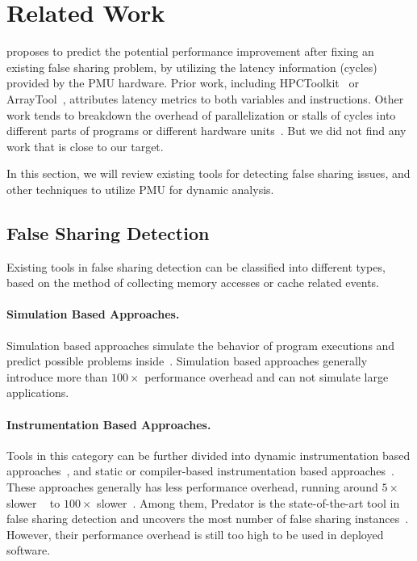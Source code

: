 \section{Related Work}

\label{sec:relatedwork}
\cheetah{} proposes to predict the potential performance improvement after fixing an existing false sharing problem, by utilizing the latency information (cycles) provided by the PMU hardware. Prior work, including HPCToolkit~\cite{ibs-sc} or ArrayTool~\cite{ibs-pact},  attributes latency metrics to both variables and instructions. Other work tends to breakdown the overhead of parallelization or stalls of cycles into different parts of programs or different hardware units~\cite{Crovella:1994:PPP:602770.602870, Azimi:2005:OPA:1088149.1088163}. But we did not find any work that is close to our target.  

In this section, we will review existing tools for detecting false sharing issues, and other techniques to utilize PMU for dynamic analysis.

\subsection{False Sharing Detection}

Existing tools in false sharing detection can be classified into different types, based on the method of collecting memory accesses or cache related events. 

\paragraph{Simulation Based Approaches.} Simulation based approaches simulate the behavior of program executions and predict possible problems inside~\cite{falseshare:simulator}. Simulation based approaches generally introduce more than $100\times$ performance overhead and can not simulate large applications. 

\paragraph{Instrumentation Based Approaches.} Tools in this category can be further divided into dynamic instrumentation based approaches~\cite{falseshare:binaryinstrumentation1, falseshare:binaryinstrumentation2, qinzhao}, and static or compiler-based instrumentation based approaches~\cite{Predator}.
These approaches generally has less performance overhead, running around $5\times$ slower ~\cite{qinzhao, Predator} to $100\times$ slower~\cite{falseshare:binaryinstrumentation1, falseshare:binaryinstrumentation2}. Among them, Predator is the state-of-the-art tool in false sharing detection and uncovers the most number of false sharing instances~\cite{Predator}. However, their performance overhead is still too high to be used in deployed software. 

